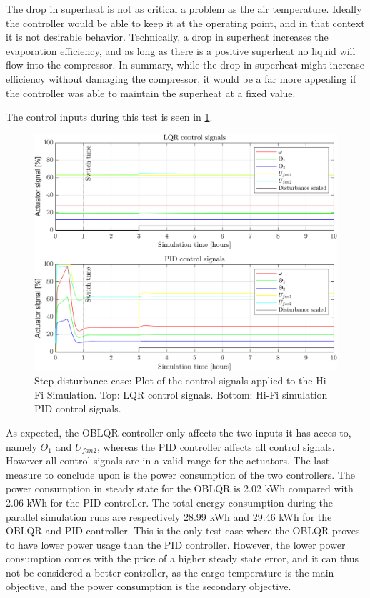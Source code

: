 The drop in superheat is not as critical a problem as the air temperature. Ideally the controller would be able to keep it at the operating point, and in that context it is not desirable behavior. Technically, a drop in superheat increases the evaporation efficiency, and as long as there is a positive superheat no liquid will flow into the compressor. In summary, while the drop in superheat might increase efficiency without damaging the compressor, it would be a far more appealing if the controller was able to maintain the superheat at a fixed value.

The control inputs during this test is seen in \cref{fig:inputs_stepDist}.

\begin{figure}[H]
	\centering
	\includegraphics[width=1\textwidth]{Graphics/fig_inputs_stepDist.png}
	\caption{Step disturbance case: Plot of the control signals applied to the Hi-Fi Simulation. Top: LQR control signals. Bottom: Hi-Fi simulation PID control signals.}
	\label{fig:inputs_stepDist}
\end{figure}

As expected, the OBLQR controller only affects the two inputs it has acces to, namely $ \Theta_1 $ and $ U_{fan2} $, whereas the PID controller affects all control signals. However all control signals are in a valid range for the actuators.
The last measure to conclude upon is the power consumption of the two controllers. The power consumption in steady state for the OBLQR is 2.02 \si{kWh} compared with 2.06 \si{kWh} for the PID controller. The total energy consumption during the parallel simulation runs are respectively 28.99 \si{kWh} and 29.46 \si{kWh} for the OBLQR and PID controller.
This is the only test case where the OBLQR proves to have lower power usage than the PID controller. However, the lower power consumption comes with the price of a higher steady state error, and it can thus not be considered a better controller, as the cargo temperature is the main objective, and the power consumption is the secondary objective. 

